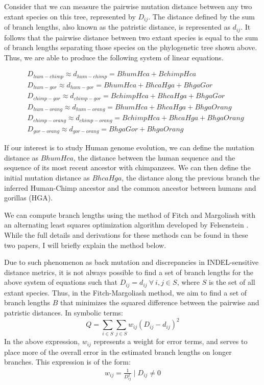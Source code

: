\documentclass{article} %
\begin{document}
Consider that we can measure the pairwise mutation distance between any two extant species on this tree, represented by $D_{ij}$. The distance defined by the sum of branch lengths, also known as the patristic distance, is represented as $d_{ij}$. It follows that the pairwise distance between two extant species is equal to the sum of branch lengths separating those species on the phylogenetic tree shown above. Thus, we are able to produce the following system of linear equations.

\begin{equation}
\begin{split}
&D_{hum-chimp} \approx d_{hum-chimp} =  BhumHca + BchimpHca\\
&D_{hum-gor} \approx d_{hum-gor} = BhumHca + BhcaHga + BhgaGor\\
&D_{chimp-gor} \approx d_{chimp-gor} = BchimpHca + BhcaHga + BhgaGor\\
&D_{hum-orang} \approx d_{hum-orang} = BhumHca + BhcaHga + BhgaOrang\\
&D_{chimp-orang} \approx d_{chimp-orang} = BchimpHca + BhcaHga + BhgaOrang\\
&D_{gor-orang} \approx d_{gor-orang} = BhgaGor + BhgaOrang
\end{split}
\end{equation}

If our interest is to study Human genome evolution, we can define the mutation distance as $BhumHca$, the distance between the human sequence and the sequence of its most recent ancestor with chimpanzees. We can then define the initial mutation distance as $BhcaHga$, the distance along the previous branch the inferred Human-Chimp ancestor and the common ancestor between humans and gorillas (HGA).\par
We can compute branch lengths using the method of Fitch and Margoliash \cite{pmid5334057} with an alternating least squares optimization algorithm developed by Felsenstein \cite{pmid11975348}. While the full details and derivations for these methods can be found in these two papers, I will briefly explain the method below.\par
Due to such phenomenon as back mutation and discrepancies in INDEL-sensitive distance metrics, it is not always possible to find a set of branch lengths for the above system of equations such that $D_{ij} = d_{ij} \: \forall \: i,j \in S$, where $S$ is the set of all extant species. Thus, in the Fitch-Margoliash method, we aim to find a set of branch lengths $B$ that minimizes the squared difference between the pairwise and patristic distances. In symbolic terms:
\begin{equation*}
	Q = \sum_{i \in S}\sum_{j \in S}w_{ij}(D_{ij} - d_{ij})^2
\end{equation*}
In the above expression, $w_{ij}$ represents a weight for error terms, and serves to place more of the overall error in the estimated branch lengths on longer branches. This expression is of the form:
\begin{equation*}
\begin{split}
	w_{ij} = \frac{1}{D_{ij}^2} \mid D_{ij} \ne 0\\
\end{split}
\end{equation*}
\end{document}
